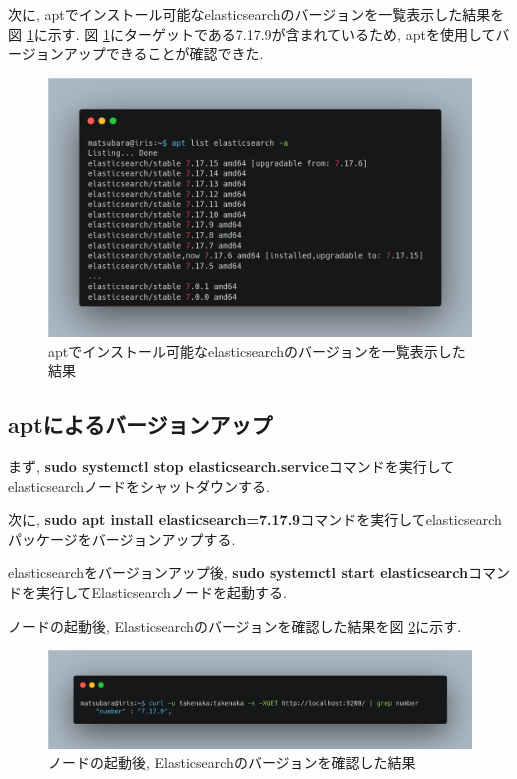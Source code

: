 次に, aptでインストール可能なelasticsearchのバージョンを一覧表示した結果を図 \ref{4-p2}に示す. 図 \ref{4-p2}にターゲットである7.17.9が含まれているため, aptを使用してバージョンアップできることが確認できた.

\begin{figure}
  \begin{center}
    \includegraphics[width=160mm]{sotu/figure/apt-list.png}
    \caption{aptでインストール可能なelasticsearchのバージョンを一覧表示した結果}
    \label{4-p2}
  \end{center}
\end{figure}

\subsection{aptによるバージョンアップ}

まず, \textbf{sudo systemctl stop elasticsearch.service}コマンドを実行してelasticsearchノードをシャットダウンする.

次に, \textbf{sudo apt install elasticsearch=7.17.9}コマンドを実行してelasticsearchパッケージをバージョンアップする.

elasticsearchをバージョンアップ後, \textbf{sudo systemctl start elasticsearch}コマンドを実行してElasticsearchノードを起動する.

ノードの起動後, Elasticsearchのバージョンを確認した結果を図 \ref{4-p3}に示す.

\begin{figure}
  \begin{center}
    \includegraphics[width=160mm]{sotu/figure/version-check.png}
    \caption{ノードの起動後, Elasticsearchのバージョンを確認した結果}
    \label{4-p3}
  \end{center}
\end{figure}

